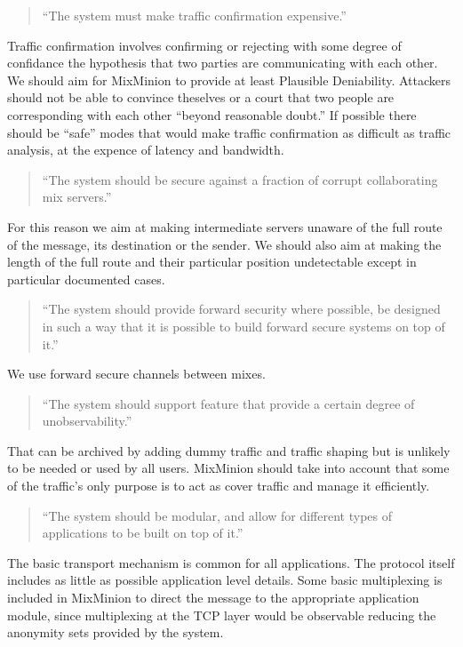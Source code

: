 \documentclass{article}
\begin{document}
\begin{quote}
     ``The system must make traffic confirmation expensive.''
\end{quote}

Traffic confirmation involves confirming or rejecting with some degree
of confidance the hypothesis that two parties are communicating with
each other. We should aim for MixMinion to provide at least Plausible 
Deniability. Attackers should not be able to convince theselves or a
court that two people are corresponding with each other ``beyond
reasonable doubt.'' If possible there should be ``safe'' modes that would 
make traffic confirmation as difficult as traffic analysis, at the
expence of latency and bandwidth.

\begin{quote}
     ``The system should be secure against a fraction of corrupt 
     collaborating mix servers.''
\end{quote}

For this reason we aim at making intermediate servers unaware of 
the full route of the message, its destination or the sender. We
should also aim at making the length of the full route and their
particular position undetectable except in particular documented
cases. 

\begin{quote}
     ``The system should provide forward security where possible, be
     designed in such a way that it is possible to build forward
     secure systems on top of it.''
\end{quote}

We use forward secure channels between mixes. 

\begin{quote}
     ``The system should support feature that provide a certain degree
      of unobservability.''
\end{quote}

That can be archived by adding dummy traffic and traffic shaping but
is unlikely to be needed or used by all users. MixMinion should take
into account that some of the traffic's only purpose is to act as
cover traffic and manage it efficiently.

\begin{quote}
     ``The system should be modular, and allow for different types of
     applications to be built on top of it.''
\end{quote}

The basic transport mechanism is common for all applications. The
protocol itself includes as little as possible application level
details. Some basic multiplexing is included in MixMinion to direct
the message to the appropriate application module, since multiplexing
at the TCP layer would be observable reducing the anonymity sets
provided by the system.
\end{document}
